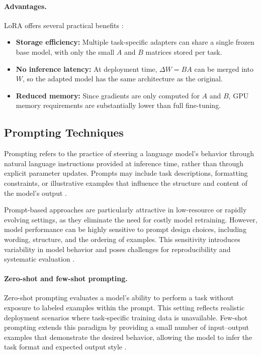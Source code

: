 \paragraph{Advantages.}
LoRA offers several practical benefits \cite{hu2021loralowrankadaptationlarge}:
\begin{itemize}
    \item \textbf{Storage efficiency:} Multiple task-specific adapters can share 
    a single frozen base model, with only the small $A$ and $B$ matrices stored 
    per task.
    \item \textbf{No inference latency:} At deployment time, $\Delta W = BA$ 
    can be merged into $W$, so the adapted model has the same architecture as 
    the original.
    \item \textbf{Reduced memory:} Since gradients are only computed for $A$ 
    and $B$, GPU memory requirements are substantially lower than full fine-tuning.
\end{itemize}

\subsection{Prompting Techniques}

Prompting refers to the practice of steering a language model's behavior through natural language instructions provided at inference time, rather than through explicit parameter updates. Prompts may include task descriptions, formatting constraints, or illustrative examples that influence the structure and content of the model's output \cite{naveed2024comprehensiveoverviewlargelanguage}.

Prompt-based approaches are particularly attractive in low-resource or rapidly evolving settings, as they eliminate the need for costly model retraining. However, model performance can be highly sensitive to prompt design choices, including wording, structure, and the ordering of examples. This sensitivity introduces variability in model behavior and poses challenges for reproducibility and systematic evaluation \cite{schulhoff2025promptreportsystematicsurvey}.

\paragraph{Zero-shot and few-shot prompting.}
Zero-shot prompting evaluates a model's ability to perform a task without exposure to labeled examples within the prompt. This setting reflects realistic deployment scenarios where task-specific training data is unavailable. Few-shot prompting extends this paradigm by providing a small number of input--output examples that demonstrate the desired behavior, allowing the model to infer the task format and expected output style \cite{brown2020languagemodelsfewshotlearners}.

